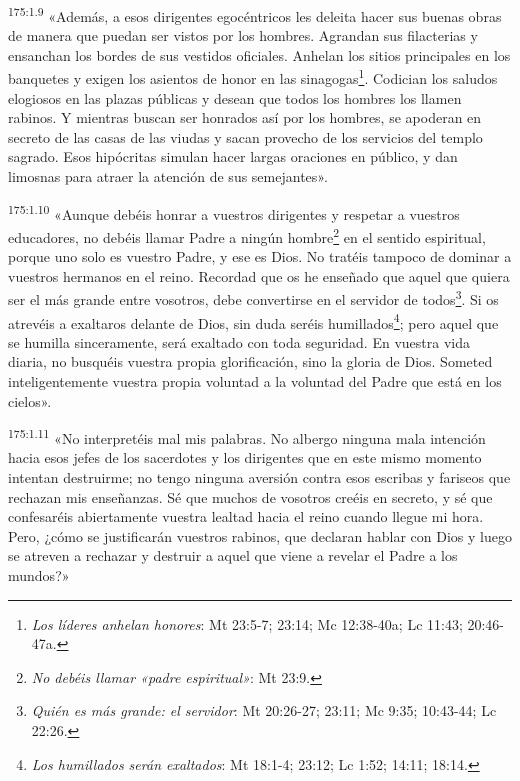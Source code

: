 \par 
\textsuperscript{175:1.9} «Además, a esos dirigentes egocéntricos les deleita hacer sus buenas obras de manera que puedan ser vistos por los hombres. Agrandan sus filacterias y ensanchan los bordes de sus vestidos oficiales. Anhelan los sitios principales en los banquetes y exigen los asientos de honor en las sinagogas\footnote{\textit{Los líderes anhelan honores}: Mt 23:5-7; 23:14; Mc 12:38-40a; Lc 11:43; 20:46-47a.}. Codician los saludos elogiosos en las plazas públicas y desean que todos los hombres los llamen rabinos. Y mientras buscan ser honrados así por los hombres, se apoderan en secreto de las casas de las viudas y sacan provecho de los servicios del templo sagrado. Esos hipócritas simulan hacer largas oraciones en público, y dan limosnas para atraer la atención de sus semejantes».

\par 
\textsuperscript{175:1.10} «Aunque debéis honrar a vuestros dirigentes y respetar a vuestros educadores, no debéis llamar Padre a ningún hombre\footnote{\textit{No debéis llamar «padre espiritual»}: Mt 23:9.} en el sentido espiritual, porque uno solo es vuestro Padre, y ese es Dios. No tratéis tampoco de dominar a vuestros hermanos en el reino. Recordad que os he enseñado que aquel que quiera ser el más grande entre vosotros, debe convertirse en el servidor de todos\footnote{\textit{Quién es más grande: el servidor}: Mt 20:26-27; 23:11; Mc 9:35; 10:43-44; Lc 22:26.}. Si os atrevéis a exaltaros delante de Dios, sin duda seréis humillados\footnote{\textit{Los humillados serán exaltados}: Mt 18:1-4; 23:12; Lc 1:52; 14:11; 18:14.}; pero aquel que se humilla sinceramente, será exaltado con toda seguridad. En vuestra vida diaria, no busquéis vuestra propia glorificación, sino la gloria de Dios. Someted inteligentemente vuestra propia voluntad a la voluntad del Padre que está en los cielos».

\par 
\textsuperscript{175:1.11} «No interpretéis mal mis palabras. No albergo ninguna mala intención hacia esos jefes de los sacerdotes y los dirigentes que en este mismo momento intentan destruirme; no tengo ninguna aversión contra esos escribas y fariseos que rechazan mis enseñanzas. Sé que muchos de vosotros creéis en secreto, y sé que confesaréis abiertamente vuestra lealtad hacia el reino cuando llegue mi hora. Pero, ¿cómo se justificarán vuestros rabinos, que declaran hablar con Dios y luego se atreven a rechazar y destruir a aquel que viene a revelar el Padre a los mundos?»

